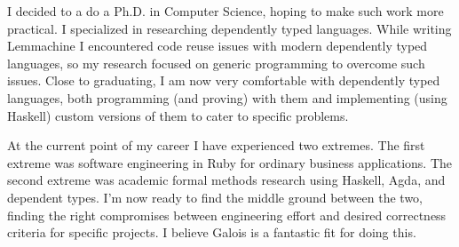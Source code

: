 \documentclass[11pt, a4paper]{awesome-cv}
\begin{document}
\begin{cvletter}
I decided to a do a Ph.D. in Computer Science, hoping to
make such work more practical. I specialized in researching
dependently typed languages. While writing Lemmachine I encountered
code reuse issues with modern dependently typed languages, so my
research focused on generic programming to overcome such issues. Close
to graduating, I am now very comfortable with dependently typed
languages, both programming (and proving) with them and
implementing (using Haskell) custom versions of them to cater to
specific problems.


At the current point of my career I have experienced two extremes. The
first extreme was software engineering in Ruby for ordinary business
applications. The second extreme was academic formal methods
research using Haskell, Agda, and dependent types. I'm now ready to find the middle ground between the two,
finding the right compromises between engineering effort and desired
correctness criteria for specific projects. I believe Galois is a fantastic
fit for doing this.

\end{cvletter}


\makeletterclosing
\end{document}
